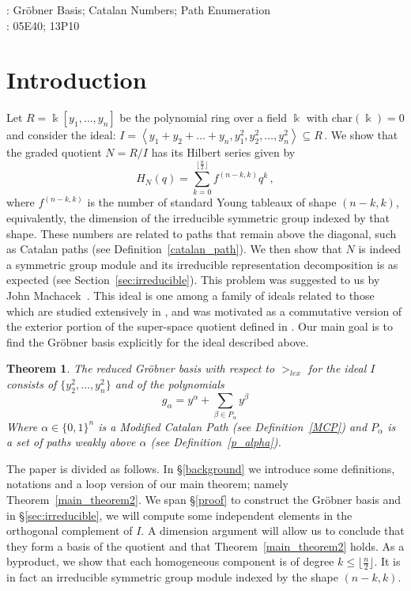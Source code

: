 \documentclass[10pt,a4paper]{article}
\newtheorem{theorem}{Theorem}[section]
\def\field{\Bbbk}
\DeclareMathOperator{\la}{\langle}
\DeclareMathOperator{\ra}{\rangle}
\begin{document}
\bigskip

: Gr\"obner Basis; Catalan Numbers; Path Enumeration\\

: 05E40; 13P10

\section{Introduction} 
Let $R = \field[y_1, \dots, y_n]$ be the polynomial ring over a field $\field$ with $\text{char}( \field) = 0$ and consider the ideal:
$I = \la y_1 + y_2 + \dots + y_n, y^2_1, y^2_2, \dots , y^2_n \ra \subseteq R\,.$
We show that the graded quotient $N = R /I$ has its Hilbert series given by 
$$H_N(q)=\sum_{k=0}^{\lfloor \frac{n}{2} \rfloor } f^{(n-k,k)}q^k\,,$$
 where $f^{(n-k,k)}$ is the number of standard Young tableaux of shape $(n-k,k)$, equivalently, the dimension of the irreducible symmetric group indexed by that shape. 
 These numbers are related to paths that remain above the diagonal, such as Catalan paths (see Definition~\ref{catalan_path}).
 We then show that $N$ is indeed a symmetric group module and
its irreducible representation decomposition is as expected (see Section~\ref{sec:irreducible}). This problem was suggested to us by John Machacek~\cite{M}.
This ideal is one among a family of ideals related to those which are studied extensively in \cite{HRS}, and was motivated as a commutative version of the exterior portion of the super-space quotient defined in \cite{Z}. Our main goal is to find the Gr\"obner basis explicitly for the ideal described above.  
\begin{theorem} \label{main_theorem}
	 The reduced Gr\"obner basis with respect to $>_{lex}$ for the ideal $I$ consists of $\{y_2^2, \dots, y_n^2\}$ and of the polynomials
	\begin{equation} \label{main_theorem_eqn}
		g_{\alpha} = y^{\alpha} + \sum_{\beta \in P_{\alpha}} y^{\beta}
	\end{equation}
	Where $\alpha \in \{0,1\}^n$ is a Modified Catalan Path (see Definition~\ref{MCP}) and $P_\alpha$ is a set of paths weakly above $\alpha$ (see Definition~\ref{p_alpha}). \end{theorem}
The   paper is divided as follows. In \S\ref{background}  we introduce some definitions, notations and a loop version of our main theorem; namely Theorem~\ref{main_theorem2}. 
We span \S\ref{proof} to construct the Gr\"obner basis and in \S\ref{sec:irreducible}, we will compute some independent elements in the orthogonal complement of $I$. A dimension argument will allow us to conclude that they form a basis of the quotient and that Theorem~\ref{main_theorem2} holds. As a byproduct, we show that each homogeneous component is of degree $k\le {\lfloor \frac{n}{2} \rfloor }$. It is in fact  an irreducible  symmetric group module indexed by the shape $(n-k,k)$.
\end{document}
